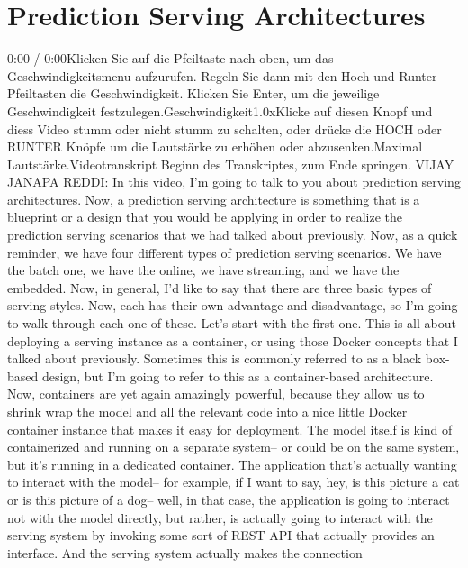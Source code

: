 {{{{{{{ \section{Prediction Serving Architectures}
 
     0:00 / 0:00Klicken Sie auf die Pfeiltaste nach oben, um das Geschwindigkeitsmenu aufzurufen. Regeln Sie dann mit den Hoch und Runter Pfeiltasten die Geschwindigkeit. Klicken Sie Enter, um die jeweilige Geschwindigkeit festzulegen.Geschwindigkeit1.0xKlicke auf diesen Knopf und diess Video stumm oder nicht stumm zu schalten, oder drücke die HOCH oder RUNTER Knöpfe um die Lautstärke zu erhöhen oder abzusenken.Maximal Lautstärke.Videotranskript
     Beginn des Transkriptes, zum Ende springen.
     VIJAY JANAPA REDDI: In this video, I'm going
     to talk to you about prediction serving architectures.
     Now, a prediction serving architecture is
     something that is a blueprint or a design
     that you would be applying in order to realize the prediction serving
     scenarios that we had talked about previously.
     Now, as a quick reminder, we have four different types
     of prediction serving scenarios.
     We have the batch one, we have the online, we have streaming,
     and we have the embedded.
     Now, in general, I'd like to say that there are
     three basic types of serving styles.
     Now, each has their own advantage and disadvantage,
     so I'm going to walk through each one of these.
     Let's start with the first one.
     This is all about deploying a serving instance as a container,
     or using those Docker concepts that I talked about previously.
     Sometimes this is commonly referred to as a black box-based design,
     but I'm going to refer to this as a container-based architecture.
     Now, containers are yet again amazingly powerful,
     because they allow us to shrink wrap the model and all the relevant code
     into a nice little Docker container instance that
     makes it easy for deployment.
     The model itself is kind of containerized and running
     on a separate system--
     or could be on the same system, but it's running in a dedicated container.
     The application that's actually wanting to interact with the model--
     for example, if I want to say, hey, is this picture a cat
     or is this picture of a dog--
     well, in that case, the application is going
     to interact not with the model directly, but rather, is actually
     going to interact with the serving system
     by invoking some sort of REST API that actually provides an interface.
     And the serving system actually makes the connection
}}}}}}}
